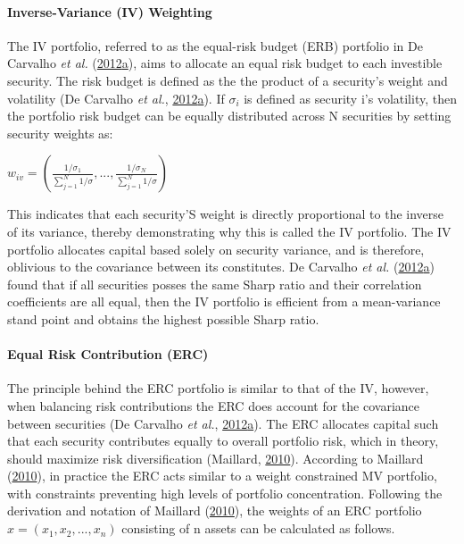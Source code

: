 \documentclass[11pt,preprint, authoryear]{elsarticle}
\numberwithin{equation}{section}
\numberwithin{figure}{section}
\numberwithin{table}{section}
\begin{document}
\hypertarget{inverse-variance-iv-weighting}{%
\paragraph{Inverse-Variance (IV)
Weighting}\label{inverse-variance-iv-weighting}}

The IV portfolio, referred to as the equal-risk budget (ERB) portfolio
in De Carvalho \emph{et al.}
(\protect\hyperlink{ref-leote}{2012}\protect\hyperlink{ref-leote}{a}),
aims to allocate an equal risk budget to each investible security. The
risk budget is defined as the the product of a security's weight and
volatility (De Carvalho \emph{et al.},
\protect\hyperlink{ref-leote}{2012}\protect\hyperlink{ref-leote}{a}). If
\(\sigma_i\) is defined as security i's volatility, then the portfolio
risk budget can be equally distributed across N securities by setting
security weights as:

\begin{center} 
$w_{iv}=(\frac{1/\sigma_1}{\sum^N_{j=1} 1/\sigma}, ...,\frac{1/\sigma_N}{\sum^N_{j=1} 1/\sigma} )$ 
\end{center}

This indicates that each security'S weight is directly proportional to
the inverse of its variance, thereby demonstrating why this is called
the IV portfolio. The IV portfolio allocates capital based solely on
security variance, and is therefore, oblivious to the covariance between
its constitutes. De Carvalho \emph{et al.}
(\protect\hyperlink{ref-leote}{2012}\protect\hyperlink{ref-leote}{a})
found that if all securities posses the same Sharp ratio and their
correlation coefficients are all equal, then the IV portfolio is
efficient from a mean-variance stand point and obtains the highest
possible Sharp ratio.

\hypertarget{equal-risk-contribution-erc}{%
\paragraph{Equal Risk Contribution
(ERC)}\label{equal-risk-contribution-erc}}

The principle behind the ERC portfolio is similar to that of the IV,
however, when balancing risk contributions the ERC does account for the
covariance between securities (De Carvalho \emph{et al.},
\protect\hyperlink{ref-leote}{2012}\protect\hyperlink{ref-leote}{a}).
The ERC allocates capital such that each security contributes equally to
overall portfolio risk, which in theory, should maximize risk
diversification (Maillard, \protect\hyperlink{ref-maillard2010}{2010}).
According to Maillard (\protect\hyperlink{ref-maillard2010}{2010}), in
practice the ERC acts similar to a weight constrained MV portfolio, with
constraints preventing high levels of portfolio concentration. Following
the derivation and notation of Maillard
(\protect\hyperlink{ref-maillard2010}{2010}), the weights of an ERC
portfolio \(x=(x_1,x_2,...,x_n)\) consisting of n assets can be
calculated as follows.
\end{document}
